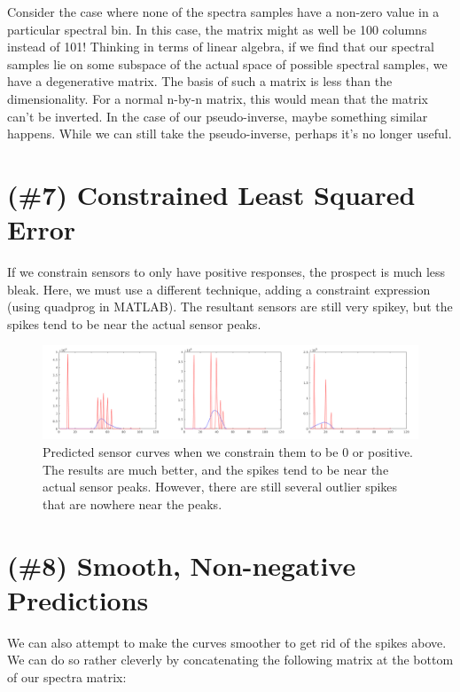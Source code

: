 \documentclass{article}
\begin{document}
Consider the case where none of the spectra samples have a non-zero value in a 
particular spectral bin. In this case, the matrix might as well be 100 columns 
instead of 101! Thinking in terms of linear algebra, if we find that our 
spectral samples lie on some subspace of the actual space of possible spectral 
samples, we have a degenerative matrix. The basis of such a matrix is less 
than the dimensionality. For a normal n-by-n matrix, this would mean that the 
matrix can't be inverted. In the case of our pseudo-inverse, maybe something 
similar happens. While we can still take the pseudo-inverse, perhaps it's no 
longer useful.

\section{(\#7) Constrained Least Squared Error}

If we constrain sensors to only have positive responses, the prospect is much 
less bleak. Here, we must use a different technique, adding a constraint 
expression (using quadprog in MATLAB). The resultant sensors are still very spikey, but the spikes tend to 
be near the actual sensor peaks.

\begin{figure}[!ht]
	\centering
	\includegraphics[width=160mm]{figs/sensors_nonzero_chanall.png}
	\caption{Predicted sensor curves when we constrain them to be 0 or positive. 
        The results are much better, and the spikes tend to be near the actual 
        sensor peaks. However, there are still several outlier spikes that are 
        nowhere near the peaks.}
\end{figure}

\section{(\#8) Smooth, Non-negative Predictions}

We can also attempt to make the curves smoother to get rid of the spikes above. 
We can do so rather cleverly by concatenating the following matrix at the bottom 
of our spectra matrix:
\end{document}
